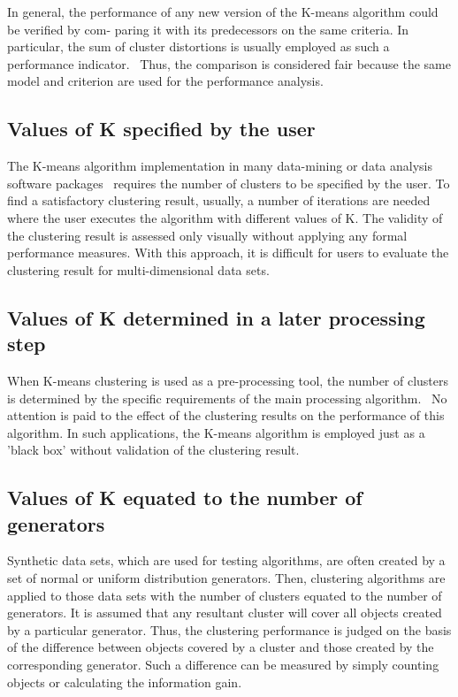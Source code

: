 In  general,  the  performance  of  any  new  version
of the K-means algorithm could be verified by com-
paring  it  with  its  predecessors  on  the  same  criteria.
In   particular,   the   sum   of   cluster   distortions   is
usually  employed  as  such  a  performance  indicator.~\cite{daoud96, bengio95}
Thus, the comparison is considered fair  because  the  same  model and  criterion  are  used
for the performance analysis.

\subsection{Values of K specified by the user}
The K-means  algorithm  implementation  in  many
data-mining   or   data   analysis   software   packages~\cite{hall02}
requires the number of clusters to be specified
by  the  user.  To  find  a  satisfactory  clustering
result,  usually,  a  number  of  iterations  are  needed
where the user executes the algorithm with different
values  of K.  The  validity  of  the  clustering  result  is
assessed  only  visually  without  applying  any  formal
performance   measures.   With   this   approach,   it   is
difficult  for  users  to  evaluate  the  clustering  result
for multi-dimensional data sets.

\subsection{Values of K determined in a later processing step}
When K-means clustering is used as a pre-processing
tool,  the  number  of  clusters  is  determined  by  the
specific requirements of the main processing algorithm.~\cite{hansen96}
No  attention  is  paid  to  the  effect  of
the  clustering  results  on  the  performance  of  this
algorithm. In such applications, the K-means
algorithm  is  employed  just  as  a  'black  box'  without
validation of the clustering result.

\subsection{Values of K equated to the number of generators}
Synthetic   data   sets,   which   are   used   for   testing
algorithms,  are  often  created  by  a  set  of  normal  or
uniform   distribution   generators.   Then,   clustering
algorithms  are  applied  to  those  data  sets  with  the
number of clusters equated to the number of generators.
It  is  assumed  that  any  resultant  cluster  will
cover  all  objects  created  by  a  particular  generator.
Thus,  the  clustering  performance  is  judged  on  the
basis  of  the  difference  between  objects  covered  by
a  cluster  and  those  created  by  the  corresponding
generator.  Such  a  difference  can  be  measured  by
simply   counting   objects   or   calculating   the
information gain.~\cite{bradly98}

